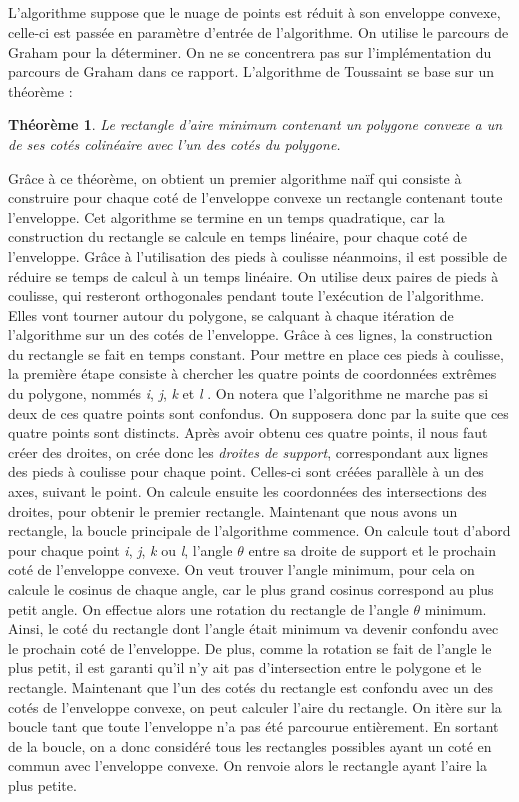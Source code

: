 \documentclass[11pt]{report}
\newtheorem{theoremA}{Théorème}
\begin{document}
\subparagraph{}
L'algorithme suppose que le nuage de points est réduit à son enveloppe convexe, celle-ci est passée en paramètre d'entrée de l'algorithme. On utilise le parcours de Graham pour la déterminer. On ne se concentrera pas sur l'implémentation du parcours de Graham dans ce rapport. L'algorithme de Toussaint se base sur un théorème : 
\begin{theoremA}Le rectangle d'aire minimum contenant un polygone convexe a un de ses cotés colinéaire avec l'un des cotés du polygone.
\end{theoremA}
Grâce à ce théorème, on obtient un premier algorithme naïf qui consiste à construire pour chaque coté de l'enveloppe convexe un rectangle contenant toute l'enveloppe. Cet algorithme se termine en un temps quadratique, car la construction du rectangle se calcule en temps linéaire, pour chaque coté de l'enveloppe. Grâce à l'utilisation des pieds à coulisse néanmoins, il est possible de réduire se temps de calcul à un temps linéaire. 
On utilise deux paires de pieds à coulisse, qui resteront orthogonales pendant toute l'exécution de l'algorithme. Elles vont tourner autour du polygone, se calquant à chaque itération de l'algorithme  sur un des cotés de l'enveloppe. Grâce à ces lignes, la construction du rectangle se fait en temps constant. 
Pour mettre en place ces pieds à coulisse, la première étape consiste à chercher les quatre points de coordonnées extrêmes du polygone, nommés \emph{i}, \emph{j}, \emph{k} et \emph{l} . On notera que l'algorithme ne marche pas si deux de ces quatre points sont confondus. On supposera donc par la suite que ces quatre points sont distincts. Après avoir obtenu ces quatre points, il nous faut créer des droites, on crée donc les \emph{droites de support}, correspondant aux lignes des pieds à coulisse pour chaque point. Celles-ci sont créées parallèle à un des axes, suivant le point. On calcule ensuite les coordonnées des intersections des droites, pour obtenir le premier rectangle. Maintenant que nous avons un rectangle, la boucle principale de l'algorithme commence. On calcule tout d'abord pour chaque point \emph{i}, \emph{j}, \emph{k} ou \emph{l}, l'angle $\theta$ entre sa droite de support et le prochain coté de l'enveloppe convexe. On veut trouver l'angle minimum, pour cela on calcule le cosinus de chaque angle, car le plus grand cosinus correspond au plus petit angle. On effectue alors une rotation du rectangle de l'angle $\theta$ minimum. Ainsi, le coté du rectangle dont l'angle était minimum va devenir confondu avec le prochain coté de l'enveloppe. De plus, comme la rotation se fait de l'angle le plus petit, il est garanti qu'il n'y ait pas d'intersection entre le polygone et le rectangle. Maintenant que l'un des cotés du rectangle est confondu avec un des cotés de l'enveloppe convexe, on peut calculer l'aire du rectangle. On itère sur la boucle tant que toute l'enveloppe n'a pas été parcourue entièrement. En sortant de la boucle, on a donc considéré tous les rectangles possibles ayant un coté en commun avec l'enveloppe convexe. On renvoie alors le rectangle ayant l'aire la plus petite.
\end{document}
